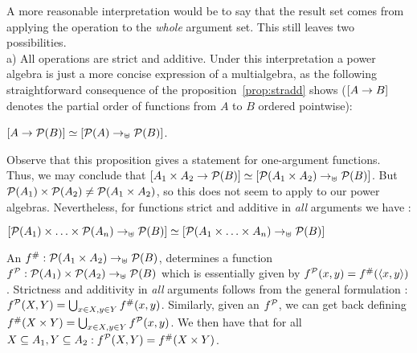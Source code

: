 A more reasonable interpretation would be to say that the result set comes from
applying the operation to the {\em whole} argument set. This still leaves two
possibilities. \\[1ex]
a) All operations are strict and additive.
Under this interpretation
a power algebra is just a more concise expression of a multialgebra,
as the following straightforward consequence of the
proposition~\ref{prop:stradd} shows ($[A\mathrel{\rightarrow} B]$ denotes the partial
order of functions from $A$ to $B$ ordered pointwise):

\begin{Claim}\label{prop:pointwise} 
$[A\mathrel{\rightarrow} {\cal P}(B)] \mathrel{\simeq} [{\cal P}(A)\mathrel{\rightarrow_{\uplus}} {\cal P}(B)]$.
\end{Claim}

\noindent
Observe that this proposition gives a statement for one-argument
functions. Thus, we may conclude that $[A_1\times A_2\mathrel{\rightarrow}
{\cal P}(B)]\mathrel{\simeq} [{\cal P}(A_1\times A_2)\mathrel{\rightarrow_{\uplus}} {\cal P}(B)]$. 
But ${\cal P}(A_1)\times{\cal P}(A_2)\not={\cal P}(A_1\times A_2)$, so this
does not seem to apply to our power algebras. Nevertheless, for functions strict
and additive in {\em all} arguments we have \cite{c:Mes}:
\begin{Claim}\label{prop:pointwiseb}
$[{\cal P}(A_1)\times\ldots\times{\cal P}(A_n)\mathrel{\rightarrow_{\uplus}}{\cal P}(B)] \mathrel{\simeq}
[{\cal P}(A_1\times\ldots\times A_n)\mathrel{\rightarrow_{\uplus}}{\cal P}(B)]$
\end{Claim}
\begin{Proof} 
An $f^{\#}:{\cal P}(A_1\times A_2)\mathrel{\rightarrow_{\uplus}}{\cal P}(B)$, determines a
function $f^{\cal P}:{\cal P}(A_1)\times{\cal P}(A_2)\mathrel{\rightarrow_{\uplus}}{\cal P}(B)$ which
is essentially given by $f^{\cal P}(x,y)=f^\#(\langle x,y\rangle)$.
Strictness and additivity in {\em all} arguments follows from the
general formulation : $f^{\cal P}(X,Y) =
\bigcup_{x\in X,y\in Y} f^{\#}(x,y)$. Similarly, given an $f^{\cal P}$,
we can get back defining $f^{\#}(X\times Y)=\bigcup_{x\in X, y\in
Y}f^{\cal P}(x,y)$. We then have that for all $X\subseteq A_1, Y\subseteq
A_2:f^{\cal P}(X,Y)=f^{\#}(X\times Y)$.
\end{Proof}

